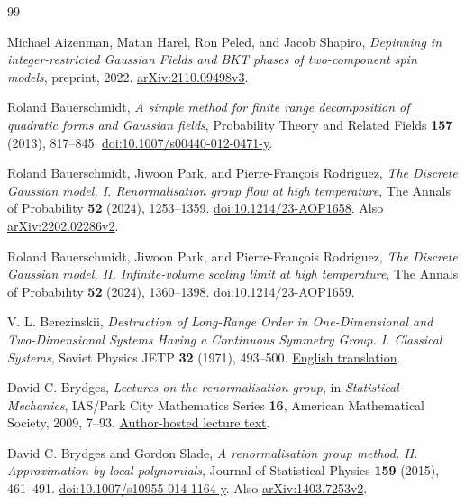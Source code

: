 \begin{thebibliography}{99}

Michael Aizenman, Matan Harel, Ron Peled, and Jacob Shapiro,
\emph{Depinning in integer-restricted Gaussian Fields and BKT phases
of two-component spin models},
preprint, 2022.
\href{https://arxiv.org/abs/2110.09498v3}{arXiv:2110.09498v3}.

Roland Bauerschmidt,
\emph{A simple method for finite range decomposition of quadratic forms
and Gaussian fields},
Probability Theory and Related Fields \textbf{157} (2013), 817--845.
\href{https://doi.org/10.1007/s00440-012-0471-y}{doi:10.1007/s00440-012-0471-y}.

Roland Bauerschmidt, Jiwoon Park, and Pierre-Fran\c{c}ois Rodriguez,
\emph{The Discrete Gaussian model, I. Renormalisation group flow at high
temperature},
The Annals of Probability \textbf{52} (2024), 1253--1359.
\href{https://doi.org/10.1214/23-AOP1658}{doi:10.1214/23-AOP1658}.
Also \href{https://arxiv.org/abs/2202.02286v2}{arXiv:2202.02286v2}.

Roland Bauerschmidt, Jiwoon Park, and Pierre-Fran\c{c}ois Rodriguez,
\emph{The Discrete Gaussian model, II. Infinite-volume scaling limit at
high temperature},
The Annals of Probability \textbf{52} (2024), 1360--1398.
\href{https://doi.org/10.1214/23-AOP1659}{doi:10.1214/23-AOP1659}.

V. L. Berezinskii,
\emph{Destruction of Long-Range Order in One-Dimensional and
Two-Dimensional Systems Having a Continuous Symmetry Group.
I. Classical Systems},
Soviet Physics JETP \textbf{32} (1971), 493--500.
\href{https://www.jetp.ras.ru/cgi-bin/dn/e_032_03_0493.pdf}{English translation}.

David C. Brydges,
\emph{Lectures on the renormalisation group},
in \emph{Statistical Mechanics},
IAS/Park City Mathematics Series \textbf{16},
American Mathematical Society, 2009, 7--93.
\href{https://personal.math.ubc.ca/~db5d/Seminars/PCMILectures/lectures.pdf}{Author-hosted lecture text}.

David C. Brydges and Gordon Slade,
\emph{A renormalisation group method. II. Approximation by local polynomials},
Journal of Statistical Physics \textbf{159} (2015), 461--491.
\href{https://doi.org/10.1007/s10955-014-1164-y}{doi:10.1007/s10955-014-1164-y}.
Also \href{https://arxiv.org/abs/1403.7253v2}{arXiv:1403.7253v2}.


\end{thebibliography}
